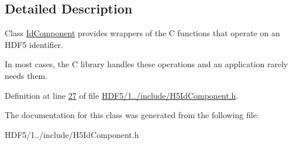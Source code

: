 \subsection{Detailed Description}
Class \hyperlink{class_h5_1_1_id_component}{Id\+Component} provides wrappers of the C functions that operate on an H\+D\+F5 identifier. 

In most cases, the C library handles these operations and an application rarely needs them. 

Definition at line \hyperlink{_h_d_f5_21_810_81_2include_2_h5_id_component_8h_source_l00027}{27} of file \hyperlink{_h_d_f5_21_810_81_2include_2_h5_id_component_8h_source}{H\+D\+F5/1../include/\+H5\+Id\+Component.\+h}.



The documentation for this class was generated from the following file\+:\begin{DoxyCompactItemize}
\item 
H\+D\+F5/1../include/\+H5\+Id\+Component.\+h\end{DoxyCompactItemize}
